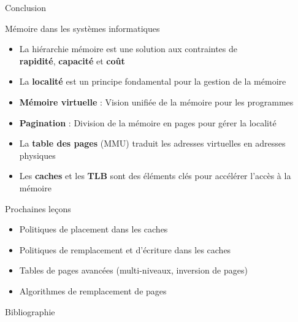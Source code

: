 \documentclass[8pt]{beamer}
\begin{document}
\begin{frame}{Conclusion}
    \begin{block}{Mémoire dans les systèmes informatiques}
        \begin{itemize}
            \item La hiérarchie mémoire est une solution aux
                  contraintes de \\\textbf{rapidité}, \textbf{capacité} et
                  \textbf{coût}
            \item La \textbf{localité} est un principe fondamental pour la
                  gestion
                  de la
                  mémoire
            \item \textbf{Mémoire virtuelle} : Vision unifiée de la
                  mémoire pour les programmes
            \item \textbf{Pagination} : Division de la mémoire en
                  pages pour gérer la
                  localité
            \item La \textbf{table des pages} (MMU) traduit les adresses
                  virtuelles en adresses physiques
            \item Les \textbf{caches} et les \textbf{TLB} sont des éléments
                  clés pour accélérer
                  l'accès à la mémoire
        \end{itemize}
    \end{block}
    \begin{exampleblock}{Prochaines leçons}
        \begin{itemize}
            \item Politiques de placement dans les caches
            \item Politiques de remplacement et d'\'ecriture dans les caches
            \item Tables de pages avancées (multi-niveaux, inversion de pages)
            \item Algorithmes de remplacement de pages
        \end{itemize}
    \end{exampleblock}
\end{frame}


\begin{frame}{Bibliographie}
    \nocite{*}
    
\end{frame}
\addtocounter{framenumber}{-1}
\end{document}
